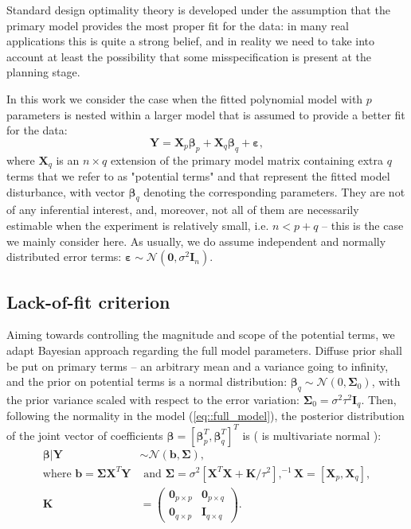 
Standard design optimality theory is developed under the assumption that the primary model provides the most proper fit for the data: in many real applications this is quite a strong belief, and in reality we need to take into account at least the possibility that some misspecification is present at the planning stage.

In this work we consider the case when the fitted polynomial model with $p$ parameters is nested within a larger model that is assumed to provide a better fit for the data:
\begin{equation}
\label{eq::full_model}
\bm{Y}=\bm{X}_p\bm{\beta}_p+\bm{X}_q\bm{\beta}_q+\bm{\varepsilon},
\end{equation}
where $\bm{X}_q$ is an $n\times q$ extension of the primary model matrix containing extra $q$  terms that we refer to as "potential terms" and that represent the fitted model disturbance, with vector $\bm{\beta}_q$ denoting the corresponding parameters. They are not of any inferential interest, and, moreover, not all of them are necessarily estimable when the experiment is relatively small, i.e. $n<p+q$ -- this is the case we mainly consider here. As usually, we do assume independent and normally distributed error terms: $\bm{\varepsilon}\sim \mathcal{N}(\bm{0},\sigma^{2}\bm{I}_{n})$. 

\subsection*{Lack-of-fit criterion}
 
Aiming towards controlling the magnitude and scope of the potential terms, we adapt Bayesian approach regarding the full model parameters.  Diffuse prior shall be put on primary terms -- an arbitrary mean and a variance going to infinity, and the prior on potential terms is a normal distribution: $\bm{\beta}_q\sim\mathcal{N}(0,\bm{\Sigma}_{0})$, with the prior variance scaled with respect to the error variation:
$\bm{\Sigma}_{0}=\sigma^{2}\tau^{2}\bm{I}_{q}$. Then, following the normality in the model (\ref{eq::full_model}), the posterior distribution of the joint vector of  coefficients $\bm{\beta}  = [\bm{\beta}^T_p, \bm{\beta}^T_q]^T$ is (\cite{Koch2007introduction} is multivariate normal \cite{DuMouchel1994}):
\begin{align*}
\bm{\beta}|\bm{Y} &\sim \mathcal{N}(\bm{b},\bm{\Sigma}), \\
\mbox{where } \bm{b} = \bm{\Sigma X}^T\bm{Y} &\mbox{ and }  \bm{\Sigma} = \sigma^{2}[\bm{X}^T\bm{X} + \bm{K}/\tau^{2}],^{-1}  \bm{X}=[\bm{X}_p, \bm{X}_q],\\
\bm{K} &= \begin{pmatrix}
\bm{0}_{p\times p} & \bm{0}_{p\times q}\\
\bm{0}_{q\times p} & \bm{I}_{q\times q}
\end{pmatrix}.
\end{align*}

